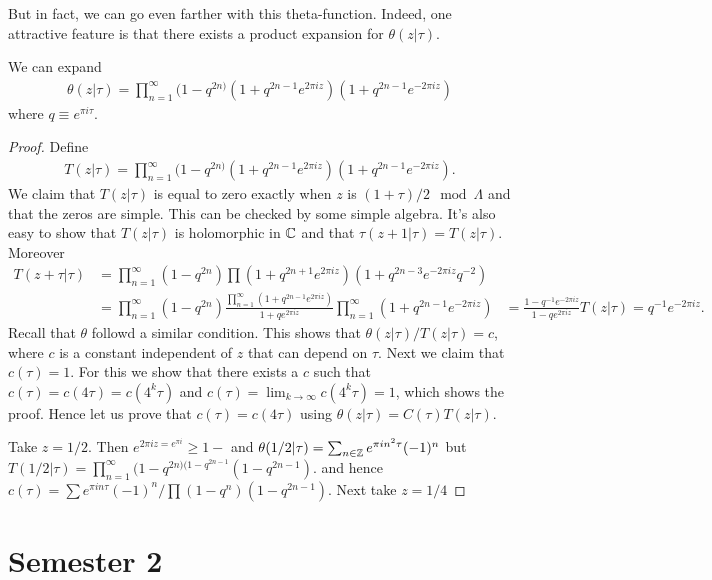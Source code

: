 \documentclass{../mathnotes}
\begin{document}
But in fact, we can go even farther with this theta-function. Indeed, one attractive feature is that there exists a product expansion for $\theta(z|\tau)$.
\begin{thm}
    We can expand
    \begin{align*}
        \theta(z|\tau)=\prod_{n=1}^\infty (1-q^{2n)}(1+q^{2n-1}e^{2\pi iz})(1+q^{2n-1}e^{-2\pi iz})
    \end{align*}
    where $q\equiv e^{\pi i\tau}$.
\end{thm}
\begin{proof}
    Define
    \begin{align*}
        T(z|\tau)=\prod_{n=1}^\infty (1-q^{2n)}(1+q^{2n-1}e^{2\pi iz})(1+q^{2n-1}e^{-2\pi iz}).
    \end{align*}
    We claim that $T(z|\tau)$ is equal to zero exactly when $z$ is $(1+\tau)/2\mod\Lambda$ and that the zeros are simple. This can be
    checked by some simple algebra. It's also easy to show that $T(z|\tau)$ is holomorphic in $\mathbb{C}$ and that $\tau(z+1|\tau)=T(z|\tau)$.
    Moreover
    \begin{align*}
        T(z+\tau|\tau)&=\prod_{n=1}^\infty (1-q^{2n})\prod\left( 1+q^{2n+1}e^{2\pi iz} \right)\left( 1+q^{2n-3}e^{-2\pi iz}q^{-2} \right)\\
        &=\prod_{n=1}^\infty (1-q^{2n})\frac{\prod_{n=1}^\infty\left( 1+q^{2n-1}e^{2\pi i z} \right)}{1+qe^{2\pi iz}}\prod_{n=1}^\infty\left( 1+q^{2n-1}e^{-2\pi iz} \right)
        &=\frac{1-q^{-1}e^{-2\pi iz}}{1-qe^{2\pi iz}}T(z|\tau)=q^{-1}e^{-2\pi iz}.
    \end{align*}
    Recall that $\theta$ followd a similar condition. This shows that $\theta(z|\tau)/T(z|\tau)=c$,
    where $c$ is a constant independent of $z$ that can depend on $\tau$. Next we claim that $c(\tau)=1$. For this we show that there exists a $c$ such that $c(\tau)=c(4\tau)=c(4^k\tau)$
    and $c(\tau)=\lim_{k\to\infty}c(4^k\tau)=1$, which shows the proof. Hence let us prove that $c(\tau)=c(4\tau)$ using $\theta(z|\tau)=C(\tau)T(z|\tau)$.

    Take $z=1/2$. Then $e^{2\pi iz=e^{\pi i}}\geq 1-$ and $\theta(1/2|\tau)=\sum_{n\in\mathbb{Z}}e^{\pi i n^2\tau}(-1)^n$ but $T(1/2|\tau)=\prod^{\infty}_{n=1}(1-q^{2n)(1-q^{2n-1}}(1-q^{2n-1})$.
    and hence $c(\tau)=\sum e^{\pi in\tau}(-1)^n/\prod(1-q^n)(1-q^{2n-1})$. Next take $z=1/4$
\end{proof}

\section{Semester 2}
\end{document}
